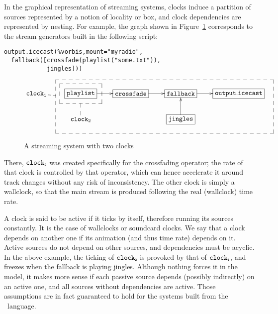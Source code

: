 In the graphical representation of streaming systems,
clocks induce a partition of sources represented by a notion of locality
or box, and clock dependencies are represented by nesting.
For example, the graph shown in Figure~\ref{fig:boxes}
corresponds to the stream generators built in the following
script:
\begin{verbatim}
output.icecast(%vorbis,mount="myradio",
  fallback([crossfade(playlist("some.txt")),
            jingles]))
\end{verbatim}

\begin{figure}[htpb]
 \begin{center}
\[
\def\f{\save
*+<15pt>[F--]\frm{}\ar @{--} "2,2"\restore}%
\def\g{\save
"2,4"."1,2"."1,5"!C*+<27pt>[F--]\frm{}\ar @{--} "1,1"\restore}%
\xymatrix{
   \mathtt{clock_1} & *+[F]{\mathtt{playlist}}\ar[r]\f&*+[F]{\mathtt{crossfade}}\ar[r]&  *+[F]{\mathtt{fallback}}\ar[r]&
  *+[F]{\mathtt{output.icecast}}\\
   &\mathtt{clock_2} &  & *+[F]{\mathtt{jingles}}\ar[u]\g& 
}
\]
\end{center}
 \caption{A streaming system with two clocks}
 \label{fig:boxes}
\end{figure}

There, $\verb.clock._{\tiny{\verb.2.}}$
was created specifically for the crossfading
operator; the rate of that clock is controlled by that operator,
which can hence accelerate it around track changes without any
risk of inconsistency.
The other clock is simply a wallclock, so that the main stream
is produced following the real (wallclock) time rate.

A clock is said to be active if it ticks by itself,
therefore running its sources constantly.
It is the case of wallclocks or soundcard clocks.
We say that a clock depends on another one
if its animation (and thus time rate) depends on it.
Active sources do not depend on other sources,
and dependencies must be acyclic.
In the above example, the ticking of
$\verb.clock._{\tiny{\verb.2.}}$ is provoked by that of
$\verb.clock._{\tiny{\verb.1.}}$, and freezes when the fallback
is playing jingles.
Although nothing forces it in the model, it makes more sense if
each passive source depends (possibly indirectly) on an active one,
and all sources without dependencies are active.
Those assumptions are in fact guaranteed to hold for the systems
built from the \liquidsoap\ language.

